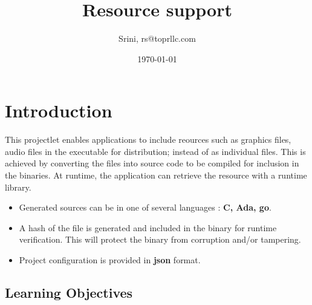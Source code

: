 \documentclass[12pt, a4paper]{article} %
\title{Resource support} %
\author{Srini, rs@toprllc.com}
\date{\small \today} %
\begin{document}

%

\maketitle %

\setcounter{page}{1} %

\section{Introduction} %

This projectlet enables applications to include reources such as graphics files, audio files in the
executable for distribution; instead of as individual files. This is achieved by converting the files into source code to be compiled for inclusion in the binaries. At runtime, the application can retrieve the resource with a runtime library.

\begin{itemize}
    \item Generated sources can be in one of several languages : \textbf{C, Ada, go}.
    \item A hash of the file is generated and included in the binary for runtime verification. This will protect the binary from corruption and/or tampering.
    \item Project configuration is provided in \textbf{json} format.
\end{itemize}

\subsection{Learning Objectives}
\end{document}
